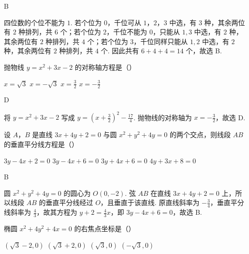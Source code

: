 \begin{answer}B\end{answer}

\begin{solution}
四位数的个位不能为 \(1\). 若个位为 \(0\)，千位可从 \(1\)，\(2\)，\(3\) 中选，有 \(3\) 种，其余两位有 \(2\) 种排列，共 \(6\) 个；若个位为 \(2\)，千位不能为 \(0\)，只能从 \(1,3\) 中选，有 \(2\) 种，其余两位有 \(2\) 种排列，共 \(4\) 个；若个位为 \(3\)，千位同样只能从 \(1,2\) 中选，有 \(2\) 种，其余两位有 \(2\) 种排列，共 \(4\) 个. 因此共有 \(6+4+4=14\) 个，故选 B.
\end{solution}

\begin{problem}
抛物线 \(y=x^{2}+3x-2\) 的对称轴方程是（\quad）

\choices
{\(x=\sqrt3\)}
{\(x=-\sqrt3\)}
{\(x=\frac32\)}
{\(x=-\frac32\)}
\end{problem}

\begin{answer}D\end{answer}

\begin{solution}
将 \(y=x^{2}+3x-2\) 写成 \(y=\left(x+\frac32\right)^{2}-\frac{17}{4}\). 抛物线的对称轴为 \(x=-\frac32\)，故选 D.
\end{solution}

\begin{problem}
设 \(A\)，\(B\) 是直线 \(3x+4y+2=0\) 与圆 \(x^{2}+y^{2}+4y=0\) 的两个交点，则线段 \(AB\) 的垂直平分线方程是（\quad）

\choices
{\(3y-4x+2=0\)}
{\(3y-4x+6=0\)}
{\(3y+4x+6=0\)}
{\(4y+3x+8=0\)}
\end{problem}

\begin{answer}B\end{answer}

\begin{solution}
圆 \(x^{2}+y^{2}+4y=0\) 的圆心为 \(O(0,-2)\). 弦 \(AB\) 在直线 \(3x+4y+2=0\) 上，所以线段 \(AB\) 的垂直平分线经过 \(O\)，且垂直于该直线. 原直线斜率为 \(-\frac34\)，垂直平分线斜率为 \(\frac43\)，故其方程为 \(y+2=\frac43x\)，即 \(3y-4x+6=0\)，故选 B.
\end{solution}

\begin{problem}
椭圆 \(x^{2}+4y^{2}+4x=0\) 的右焦点坐标是（\quad）

\choices
{\((\sqrt3-2,0)\)}
{\((\sqrt3+2,0)\)}
{\((\sqrt3,0)\)}
{\((-\sqrt3,0)\)}
\end{problem}

